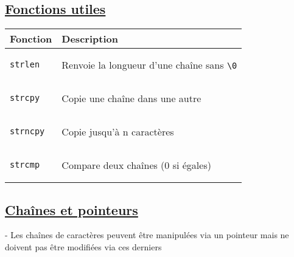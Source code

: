 \documentclass[a3paper,12pt]{article}
\begin{document}
\begin{minipage}[t]{0.49\textwidth}
\begin{tcolorbox}[title=Chaînes de caractères, fonttitle=\large, top=5pt, bottom=0pt, boxsep=1pt, colback=white,
  colframe= orange!30!pink, 
  colbacktitle=orange!30!pink,
  coltitle=white,]
\subsection*{{\small \underline{Fonctions utiles}}}
\begin{tabular}{|l|p{8cm}|}
\hline
\textbf{Fonction} & \textbf{Description} \\
\hline
\begin{minipage}[t]{1.5cm}
\vspace{-\baselineskip}
\begin{lstlisting}[language=C, basicstyle=\small , aboveskip=5pt, belowskip=5pt]
strlen
\end{lstlisting}
\vspace{-\baselineskip}
\end{minipage}
& Renvoie la longueur d’une chaîne sans \verb|\0|\\
\hline
\begin{minipage}[t]{1.5cm}
\vspace{-\baselineskip}
\begin{lstlisting}[language=C, basicstyle=\small , aboveskip=5pt, belowskip=5pt]
strcpy
\end{lstlisting}
\vspace{-\baselineskip}
\end{minipage}
& Copie une chaîne dans une autre\\
\hline
\begin{minipage}[t]{1.5cm}
\vspace{-\baselineskip}
\begin{lstlisting}[language=C, basicstyle=\small , aboveskip=5pt, belowskip=5pt]
strncpy
\end{lstlisting}
\vspace{-\baselineskip}
\end{minipage}
& Copie jusqu’à n caractères\\
\hline
\begin{minipage}[t]{1.5cm}
\vspace{-\baselineskip}
\begin{lstlisting}[language=C, basicstyle=\small , aboveskip=5pt, belowskip=5pt]
strcmp
\end{lstlisting}
\vspace{-\baselineskip}
\end{minipage}
& Compare deux chaînes (0 si égales)\\
\hline
\end{tabular}
\vspace{-0.3em}
\subsection*{{\small \underline{Chaînes et pointeurs}}}
\vspace{-0.3em}
- Les chaînes de caractères peuvent être manipulées via un pointeur mais ne doivent pas être modifiées via ces derniers


\end{tcolorbox}
\end{minipage}
\end{document}
